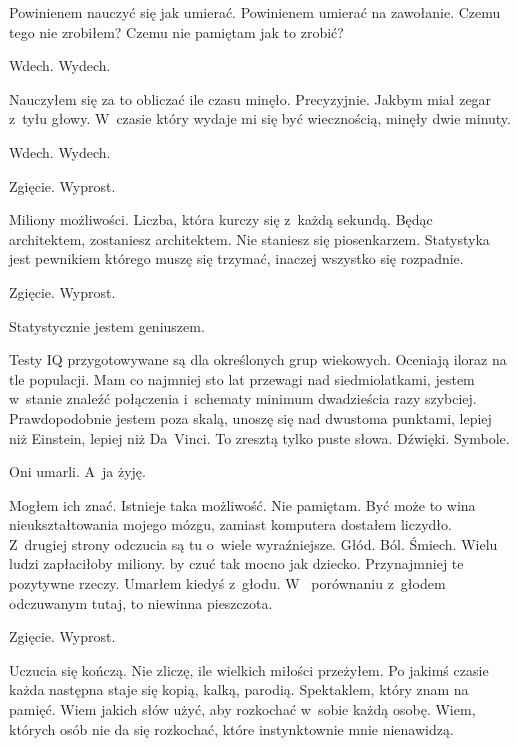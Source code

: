 Powinienem nauczyć się jak umierać. Powinienem umierać na zawołanie. Czemu tego nie zrobiłem? Czemu nie pamiętam jak 
to zrobić? 

\begin{itquote}
Wdech. Wydech.
\end{itquote}

Nauczyłem się za to obliczać ile czasu minęło. Precyzyjnie. Jakbym miał zegar z~tyłu głowy. W~czasie który wydaje mi 
się być wiecznością, minęły dwie minuty.

\begin{itquote}
Wdech. Wydech.
\end{itquote}

\begin{itquote}
Zgięcie. Wyprost.
\end{itquote}

Miliony możliwości. Liczba, która kurczy się z~każdą sekundą. Będąc architektem, zostaniesz architektem. Nie staniesz 
się piosenkarzem. Statystyka jest pewnikiem którego muszę się trzymać, inaczej wszystko się rozpadnie. 

\begin{itquote}
Zgięcie. Wyprost.
\end{itquote}

Statystycznie jestem geniuszem.

Testy IQ przygotowywane są dla określonych grup wiekowych. Oceniają iloraz na tle populacji. Mam co najmniej sto lat 
przewagi nad siedmiolatkami, jestem w~stanie znaleźć połączenia i~schematy minimum dwadzieścia razy szybciej. 
Prawdopodobnie jestem poza skalą, unoszę się nad dwustoma punktami, lepiej niż Einstein, lepiej niż Da~Vinci. To 
zresztą tylko puste słowa. Dźwięki. Symbole. 

Oni umarli. A~ja żyję.

Mogłem ich znać. Istnieje taka możliwość. Nie pamiętam. Być może to wina nieukształtowania mojego mózgu, zamiast 
komputera dostałem liczydło. Z~drugiej strony odczucia są tu o~wiele wyraźniejsze. Głód. Ból. Śmiech. Wielu ludzi 
zapłaciłoby miliony. by czuć tak mocno jak dziecko. Przynajmniej te pozytywne rzeczy. Umarłem kiedyś z~głodu. W~
porównaniu z~głodem odczuwanym tutaj, to niewinna pieszczota.

\begin{itquote}
Zgięcie. Wyprost.
\end{itquote}

Uczucia się kończą. Nie zliczę, ile wielkich miłości przeżyłem. Po jakimś czasie każda następna staje się kopią, 
kalką, parodią. Spektaklem, który znam na pamięć. Wiem jakich słów użyć, aby rozkochać w~sobie każdą osobę. Wiem, 
których osób nie da się rozkochać, które instynktownie mnie nienawidzą.


